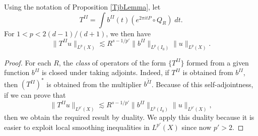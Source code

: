 \begin{lemma} \label{LocalSmoothingLargeTimesTheorem}
    Using the notation of Proposition \ref{TjbLemma}, let
    \[ T^{II} = \int b^{II}(t) (e^{2 \pi i t P} \circ Q_R)\; dt. \]
    For $1 < p < 2 (d-1)/(d+1)$, we then have
    \[ \| T^{II} u \|_{L^p(X)} \lesssim R^{s - 1/p'} \| b^{II} \|_{L^p(I_0)} \| u \|_{L^p(X)}. \]
\end{lemma}
\begin{proof}
    For each $R$, the \emph{class} of operators of the form $\{ T^{II} \}$ formed from a given function $b^{II}$ is closed under taking adjoints. Indeed, if $T^{II}$ is obtained from $b^{II}$, then $(T^{II})^*$ is obtained from the multiplier $\overline{b^{II}}$. Because of this self-adjointness, if we can prove that
    \begin{equation}
        \| T^{II} u \|_{L^{p'}(X)} \lesssim R^{s - 1/p'} \| b^{II} \|_{L^p(I_0)} \| u \|_{L^{p'}(X)},
    \end{equation}
    then we obtain the required result by duality. We apply this duality because it is easier to exploit local smoothing inequalities in $L^{p'}(X)$ since now $p' > 2$.


\end{proof}
